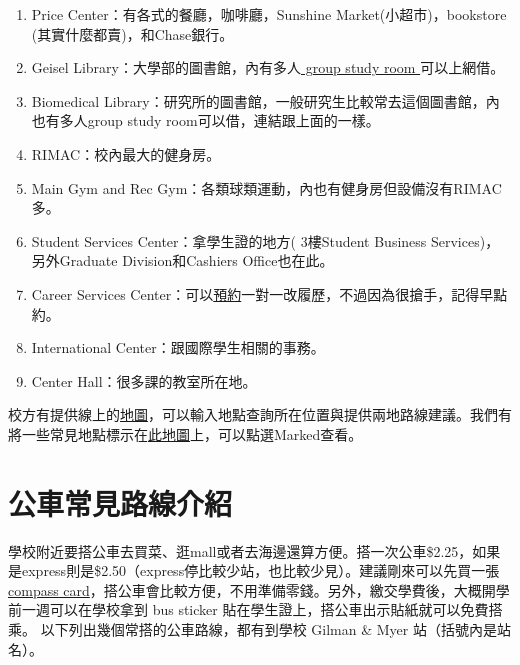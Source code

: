 \documentclass[10pt,a4paper]{book}
\begin{document}
\begin{CJK}{UTF8}{bkai}
\begin{enumerate}
\item Price Center：有各式的餐廳，咖啡廳，Sunshine Market(小超市)，bookstore
(其實什麼都賣)，和Chase銀行。

\item Geisel Library：大學部的圖書館，內有多人\href{http://libraries.ucsd.edu/spaces/reserve/}{ group study room }可以上網借。

\item Biomedical Library：研究所的圖書館，一般研究生比較常去這個圖書館，內也有多人group study room可以借，連結跟上面的一樣。 

\item RIMAC：校內最大的健身房。

\item Main Gym and Rec Gym：各類球類運動，內也有健身房但設備沒有RIMAC多。

\item Student Services Center：拿學生證的地方(
3樓Student Business Services)，另外Graduate Division和Cashiers Office也在此。

\item Career Services Center：可以\href{https://career.ucsd.edu/individual-advising.html}{預約}一對一改履歷，不過因為很搶手，記得早點約。

\item International Center：跟國際學生相關的事務。

\item Center Hall：很多課的教室所在地。
\end{enumerate}

校方有提供線上的\href{http://act.ucsd.edu/maps/}{地圖}，可以輸入地點查詢所在位置與提供兩地路線建議。我們有將一些常見地點標示在\href{http://act.ucsd.edu/maps/?lat=32.881&lng=-117.2305&t=roadmap&z=15&p=8101341227612288%
}{此地圖}上，可以點選Marked查看。

\section{公車常見路線介紹}
學校附近要搭公車去買菜、逛mall或者去海邊還算方便。搭一次公車\$2.25，如果是express則是\$2.50（express停比較少站，也比較少見）。建議剛來可以先買一張\href{http://www.sdmts.com/fares-passes/compass-card}{ compass card}，搭公車會比較方便，不用準備零錢。另外，繳交學費後，大概開學前一週可以在學校拿到 bus sticker 貼在學生證上，搭公車出示貼紙就可以免費搭乘。
以下列出幾個常搭的公車路線，都有到學校 Gilman \& Myer 站（括號內是站名）。


\end{CJK}
\end{document}
